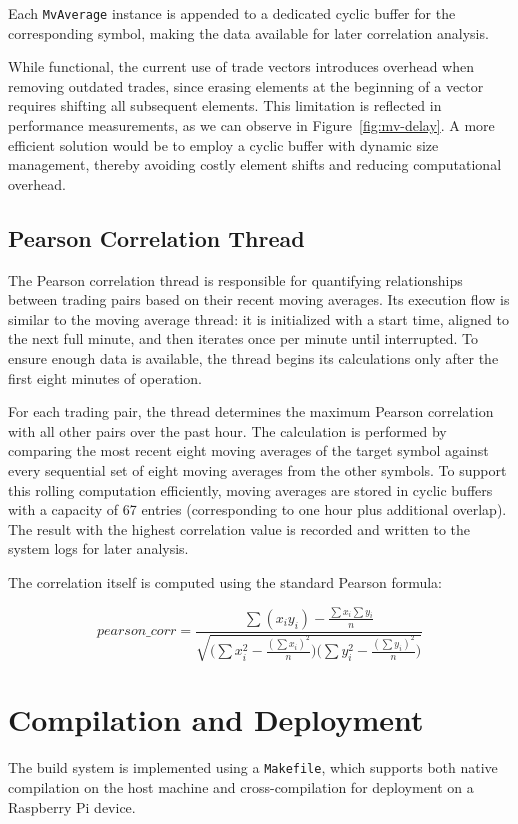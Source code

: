 \documentclass[11pt]{article}
\begin{document}
Each \texttt{MvAverage} instance is appended to a dedicated cyclic buffer for the corresponding symbol, making the data available for later correlation analysis.

While functional, the current use of trade vectors introduces overhead when removing outdated trades, since erasing elements at the beginning of a vector requires shifting all subsequent elements. This limitation is reflected in performance measurements, as we can observe in Figure~\ref{fig:mv-delay}. A more efficient solution would be to employ a cyclic buffer with dynamic size management, thereby avoiding costly element shifts and reducing computational overhead.

\subsection{Pearson Correlation Thread}
The Pearson correlation thread is responsible for quantifying relationships between trading pairs based on their recent moving averages. Its execution flow is similar to the moving average thread: it is initialized with a start time, aligned to the next full minute, and then iterates once per minute until interrupted. To ensure enough data is available, the thread begins its calculations only after the first eight minutes of operation.

For each trading pair, the thread determines the maximum Pearson correlation with all other pairs over the past hour. The calculation is performed by comparing the most recent eight moving averages of the target symbol against every sequential set of eight moving averages from the other symbols. To support this rolling computation efficiently, moving averages are stored in cyclic buffers with a capacity of 67 entries (corresponding to one hour plus additional overlap). The result with the highest correlation value is recorded and written to the system logs for later analysis.

The correlation itself is computed using the standard Pearson formula:

\[
pearson\_corr = \frac{\sum (x_i y_i) - \frac{\sum x_i \sum y_i}{n}}
{\sqrt{\Big(\sum x_i^2 - \frac{(\sum x_i)^2}{n}\Big) \Big(\sum y_i^2 - \frac{(\sum y_i)^2}{n}\Big)}}
\]

\section{Compilation and Deployment}

The build system is implemented using a \texttt{Makefile}, which supports both native compilation on the host machine and cross-compilation for deployment on a Raspberry Pi device.
\end{document}
